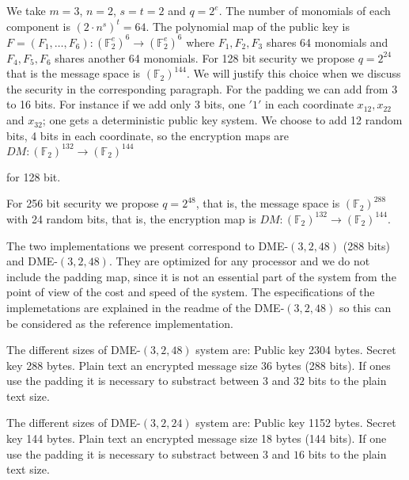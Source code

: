 \documentclass[12pt,a4paper]{amsart}
\theoremstyle{remark}
\theoremstyle{definition}
\begin{document}
We take $m=3$, $n=2$, $s=t=2$ and $q=2^e$. The number of monomials of each component is $(2\cdot n^s)^t=64$.
The polynomial map of the public key is $F=(F_1,\dots,F_6): (\mathbb{F}_2^e)^6 \to (\mathbb{F}_2^e)^6 $ where $F_1,F_2,F_3$ shares
64 monomials and $F_4,F_5,F_6$ shares another 64 monomials. 
For 128 bit security we propose $q=2^{24}$ that is the message space is $(\mathbb{F}_2)^{144}$.
We will justify this choice when we discuss the security in the corresponding paragraph.
For the padding we can add from 3 to 16 bits. For instance if we add only 3 bits, one $'1'$ in 
each coordinate $x_{12},x_{22}$ and $x_{32}$; one gets a deterministic public key system. 
We choose to add 12 random bits, 4 bits in each coordinate, so the encryption maps are 
$DM: (\mathbb{F}_2)^{132}\to (\mathbb{F}_2)^{144}$
\begin{center}
\end{center}
for 128 bit.

For 256 bit security we propose $q=2^{48}$, that is, the message space is 
$(\mathbb{F}_2)^{288}$ with 24 random bits, that is, the encryption map is 
$DM: (\mathbb{F}_2)^{132}\to (\mathbb{F}_2)^{144}.$
\begin{center}
\end{center}

The two implementations we present correspond to DME-$(3,2,48)$ (288 bits) and
DME-$(3,2,48)$. They are optimized for any processor and we do not include the padding map, 
since it is not an essential part of the system from the point of view of
the cost and speed of the system. The especifications of
the implemetations are explained in the readme of the  DME-$(3,2,48)$ so this
can be considered as the reference implementation.

The different sizes of DME-$(3,2,48)$ system are:
Public key 2304 bytes. Secret key 288 bytes. Plain text an encrypted
message size 36 bytes (288 bits). If ones use the padding it is
necessary to substract between $3$ and $32$ bits to the plain text size.

The different sizes of  DME-$(3,2,24)$ system are:
Public key 1152 bytes. Secret key 144 bytes. Plain text an encrypted
message size 18 bytes (144 bits). If one use the padding it is
necessary to substract between $3$ and $16$ bits to the plain text size.
\end{document}
